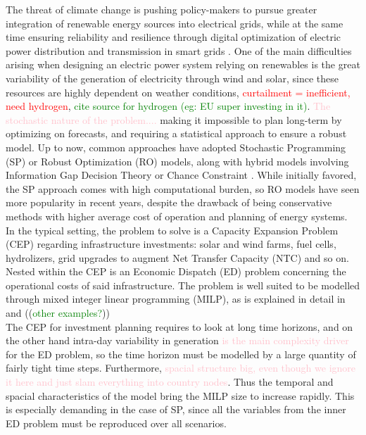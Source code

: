 The threat of climate change is pushing policy-makers to pursue greater integration of renewable energy sources into electrical grids, while at the same time ensuring reliability and resilience through digital optimization of electric power distribution and transmission in smart grids \textcolor{green}{\cite{EU_context}}. One of the main difficulties arising when designing an electric power system relying on renewables is the great variability of the generation of electricity through wind and solar, since these resources are highly dependent on weather conditions, \textcolor{red}{curtailment = inefficient, need hydrogen}, \textcolor{Green}{cite source for hydrogen (eg: EU super investing in it)}. \textcolor{pink}{The stochastic nature of the problem....} making it impossible to plan long-term by optimizing on forecasts, and requiring a statistical approach to ensure a robust model.
Up to now, common approaches have adopted Stochastic Programming (SP) or Robust Optimization (RO) models, along with hybrid models involving Information Gap Decision Theory or Chance Constraint \textcolor{green}{\cite{review_math_opt}}. While initially favored, the SP approach comes with high computational burden, so RO models have seen more popularity in recent years, despite the drawback of being conservative methods with higher average cost of operation and planning of energy systems.\\
\indent In the typical setting, the problem to solve is a Capacity Expansion Problem (CEP) regarding infrastructure investments: solar and wind farms, fuel cells, hydrolizers, grid upgrades to augment Net Transfer Capacity (NTC) and so on. Nested within the CEP is an Economic Dispatch (ED) problem concerning the operational costs of said infrastructure. 
The problem is well suited to be modelled through mixed integer linear programming (MILP), as is explained in detail in \textcolor{green}{\cite{INTRO_isolated_MIP}} and ((\textcolor{Green}{other examples?}))\\
\indent The CEP for investment planning requires to look at long time horizons, and on the other hand intra-day variability in generation \textcolor{pink}{is the main complexity driver} for the ED problem, so the time horizon must be modelled by a large quantity of fairly tight time steps. Furthermore, \textcolor{pink}{spacial structure big, even though we ignore it here and just slam everything into country nodes}. 
Thus the temporal and spacial characteristics of the model bring the MILP size to increase rapidly. This is especially demanding in the case of SP, since all the variables from the inner ED problem must be reproduced over all scenarios.\\
